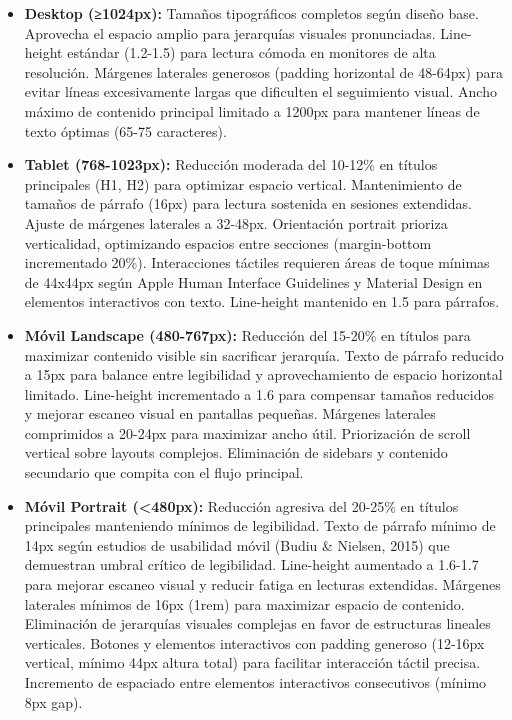 \documentclass[12pt,a4paper,oneside]{article}
\begin{document}
\begin{itemize}
    \item \textbf{Desktop (≥1024px):} Tamaños tipográficos completos según diseño base. Aprovecha el espacio amplio para jerarquías visuales pronunciadas. Line-height estándar (1.2-1.5) para lectura cómoda en monitores de alta resolución. Márgenes laterales generosos (padding horizontal de 48-64px) para evitar líneas excesivamente largas que dificulten el seguimiento visual. Ancho máximo de contenido principal limitado a 1200px para mantener líneas de texto óptimas (65-75 caracteres).
    
    \item \textbf{Tablet (768-1023px):} Reducción moderada del 10-12\% en títulos principales (H1, H2) para optimizar espacio vertical. Mantenimiento de tamaños de párrafo (16px) para lectura sostenida en sesiones extendidas. Ajuste de márgenes laterales a 32-48px. Orientación portrait prioriza verticalidad, optimizando espacios entre secciones (margin-bottom incrementado 20\%). Interacciones táctiles requieren áreas de toque mínimas de 44x44px según Apple Human Interface Guidelines y Material Design en elementos interactivos con texto. Line-height mantenido en 1.5 para párrafos.
    
    \item \textbf{Móvil Landscape (480-767px):} Reducción del 15-20\% en títulos para maximizar contenido visible sin sacrificar jerarquía. Texto de párrafo reducido a 15px para balance entre legibilidad y aprovechamiento de espacio horizontal limitado. Line-height incrementado a 1.6 para compensar tamaños reducidos y mejorar escaneo visual en pantallas pequeñas. Márgenes laterales comprimidos a 20-24px para maximizar ancho útil. Priorización de scroll vertical sobre layouts complejos. Eliminación de sidebars y contenido secundario que compita con el flujo principal.
    
    \item \textbf{Móvil Portrait (<480px):} Reducción agresiva del 20-25\% en títulos principales manteniendo mínimos de legibilidad. Texto de párrafo mínimo de 14px según estudios de usabilidad móvil (Budiu \& Nielsen, 2015) que demuestran umbral crítico de legibilidad. Line-height aumentado a 1.6-1.7 para mejorar escaneo visual y reducir fatiga en lecturas extendidas. Márgenes laterales mínimos de 16px (1rem) para maximizar espacio de contenido. Eliminación de jerarquías visuales complejas en favor de estructuras lineales verticales. Botones y elementos interactivos con padding generoso (12-16px vertical, mínimo 44px altura total) para facilitar interacción táctil precisa. Incremento de espaciado entre elementos interactivos consecutivos (mínimo 8px gap).
\end{itemize}
\end{document}
